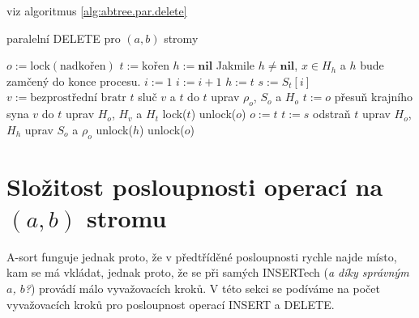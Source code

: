 viz algoritmus \ref{alg:abtree.par.delete}

\begin{algorithm}[!htb]
\caption{paralelní DELETE pro $(a,b)$ stromy}
\label{alg:abtree.par.delete}
\begin{algorithmic}
\STATE $o := \text{lock}(\text{nadkořen})$ 
\STATE $t := \text{kořen}$ 
\STATE $h := \textbf{nil}$ \COMMENT 
	{Jakmile $h \neq \textbf{nil}$, 
	$x \in H_h$ a $h$ bude zamčený do konce procesu.}
\STATE {}
	\STATE $i := 1$
		\STATE $i := i + 1$
	\ENDWHILE
		\STATE $h := t$
	\ENDIF
	\STATE $s := S_t[i]$ 
	\STATE {}
		\STATE $v := \text{bezprostřední bratr } t$ %
			\STATE {}
			\STATE sluč $v$ a $t$ do $t$ 
			\STATE uprav $\rho_o$, $S_o$ a $H_o$
			\STATE $t := o$
			\STATE {}
			\STATE přesuň krajního syna $v$ do $t$
			\STATE uprav $H_o$, $H_v$ a $H_t$
		\ENDIF
	\ENDIF
	\STATE lock($t$) 
		\STATE unlock($o$)
	\ENDIF
	\STATE $o := t$
	\STATE $t := s$
\ENDWHILE
{}
	\STATE odstraň $t$
	\STATE uprav $H_o$, $H_h$
	\STATE uprav $S_o$ a $\rho_o$
	\STATE unlock($h$)
\ENDIF
\STATE unlock($o$)
\end{algorithmic}
\end{algorithm}


\section{Složitost posloupnosti operací na $(a,b)$ stromu}

A-sort funguje jednak proto, že v předtříděné posloupnosti rychle
najde místo, kam se má vkládat, jednak proto, že se při samých
INSERTech ({\it a díky správným $a$, $b$?}) provádí málo
vyvažovacích kroků. V této sekci se podíváme na počet vyvažovacích
kroků pro posloupnost operací INSERT a DELETE.

